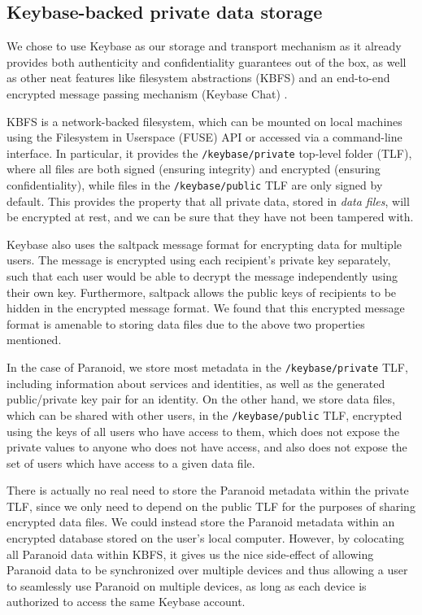 \documentclass[letterpaper,twocolumn,10pt]{article}
\begin{document}
\subsection{Keybase-backed private data storage}

We chose to use Keybase \cite{Keybase} as our storage and transport mechanism as it already provides both authenticity and confidentiality guarantees out of the box, as well as other neat features like filesystem abstractions (KBFS) \cite{KBFS} and an end-to-end encrypted message passing mechanism (Keybase Chat) \cite{KeybaseChat}.

KBFS is a network-backed filesystem, which can be mounted on local machines using the Filesystem in Userspace (FUSE) API or accessed via a command-line interface. In particular, it provides the \texttt{/keybase/private} top-level folder (TLF), where all files are both signed (ensuring integrity) and encrypted (ensuring confidentiality), while files in the \texttt{/keybase/public} TLF are only signed by default. This provides the property that all private data, stored in \textit{data files}, will be encrypted at rest, and we can be sure that they have not been tampered with.

Keybase also uses the saltpack \cite{saltpack} message format for encrypting data for multiple users. The message is encrypted using each recipient's private key separately, such that each user would be able to decrypt the message independently using their own key. Furthermore, saltpack allows the public keys of recipients to be hidden in the encrypted message format. We found that this encrypted message format is amenable to storing data files due to the above two properties mentioned.

In the case of Paranoid, we store most metadata in the \texttt{/keybase/private} TLF, including information about services and identities, as well as the generated public/private key pair for an identity. On the other hand, we store data files, which can be shared with other users, in the \texttt{/keybase/public} TLF, encrypted using the keys of all users who have access to them, which does not expose the private values to anyone who does not have access, and also does not expose the set of users which have access to a given data file.

There is actually no real need to store the Paranoid metadata within the private TLF, since we only need to depend on the public TLF for the purposes of sharing encrypted data files. We could instead store the Paranoid metadata within an encrypted database stored on the user's local computer. However, by colocating all Paranoid data within KBFS, it gives us the nice side-effect of allowing Paranoid data to be synchronized over multiple devices and thus allowing a user to seamlessly use Paranoid on multiple devices, as long as each device is authorized to access the same Keybase account.
\end{document}
